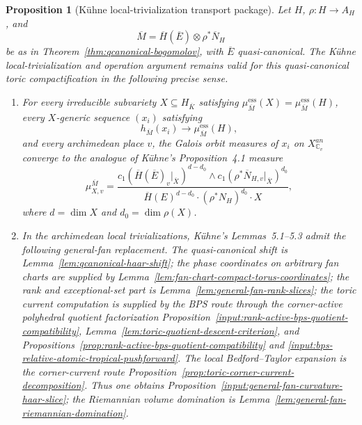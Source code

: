 \documentclass[10pt,a4paper]{amsart}
\theoremstyle{plain}
\newtheorem{proposition}[theorem]{Proposition}
\theoremstyle{plain}
\numberwithin{equation}{section}
\providecommand{\bN}{\overline{N}}
\providecommand{\bE}{\overline{E}}
\providecommand{\bM}{\overline{M}}
\providecommand{\muess}{\mu^{\mathrm{ess}}}
\begin{document}
\begin{proposition}[K\"uhne local-trivialization transport package]
	\label{prop:kuhne-section4-transport}
	Let \(H\), \(\rho:H\to A_H\), and
	\[
	\bM=\overline H(\bE)\otimes\rho^*\bN_H
	\]
	be as in Theorem~\ref{thm:qcanonical-bogomolov}, with \(\bE\) quasi-canonical.  The
	K\"uhne local-trivialization and operation argument remains valid for this
	quasi-canonical toric compactification in the following precise sense.
	
	\begin{enumerate}[label=\textup{(\alph*)},leftmargin=2em]
		\item For every irreducible subvariety
		\(X\subseteq H_{\overline K}\) satisfying
		\(\muess_{\bM}(X)=\muess_{\bM}(H)\), every \(X\)-generic sequence
		\((x_i)\) satisfying
		\[
		h_{\bM}(x_i)\longrightarrow\muess_{\bM}(H),
		\]
		and every archimedean place \(v\), the Galois orbit measures of \(x_i\) on
		\(X^{an}_{\mathbb C_v}\) converge to the analogue of K\"uhne's
		Proposition~4.1 measure
		\[
		\mu_{X,v}^{\bM}
		=
		\frac{
			c_1(\overline H(\bE)_v|_{\overline X})^{d-d_0}
			\wedge
			c_1(\rho^*\bN_{H,v}|_{\overline X})^{d_0}
		}{
			\overline H(E)^{d-d_0}\cdot(\rho^*N_H)^{d_0}\cdot X
		},
		\]
		where \(d=\dim X\) and \(d_0=\dim\rho(X)\).
		
		\item In the archimedean local trivializations, K\"uhne's Lemmas~5.1--5.3
		admit the following general-fan replacement.  The quasi-canonical shift is
		Lemma~\ref{lem:qcanonical-haar-shift}; the phase coordinates on arbitrary fan
		charts are supplied by Lemma~\ref{lem:fan-chart-compact-torus-coordinates};
		the rank and exceptional-set part is Lemma~\ref{lem:general-fan-rank-slices};
		the toric current computation is supplied by the BPS route through the
		corner-active polyhedral quotient factorization
		Proposition~\ref{input:rank-active-bps-quotient-compatibility},
		Lemma~\ref{lem:toric-quotient-descent-criterion}, and
		Propositions~\ref{prop:rank-active-bps-quotient-compatibility} and
		\ref{input:bps-relative-atomic-tropical-pushforward}.  The local
		Bedford--Taylor expansion is the corner-current route
		Proposition~\ref{prop:toric-corner-current-decomposition}.  Thus one obtains
		Proposition~\ref{input:general-fan-curvature-haar-slice}; the Riemannian
		volume domination is
		Lemma~\ref{lem:general-fan-riemannian-domination}.
		

\end{enumerate}
\end{proposition}
\end{document}
